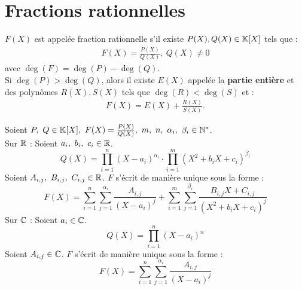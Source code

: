 \section{Fractions rationnelles}
\begin{definition}
	$F(X)$ est appelée fraction rationnelle s'il existe $P(X), Q(X) \in \mathbb{K}[X]$ tels que :
	\begin{align*}
		F(X) = \frac{P(X)}{Q(X)},\ Q(X) \neq 0
	\end{align*}
	avec $\deg(F) = \deg(P) - \deg(Q)$. \\
	Si $\deg(P) > \deg(Q)$, alors il existe $E(X)$ appelée la \textbf{partie entière} et des polynômes $R(X), S(X)$ tels que $\deg(R) < \deg(S)$ et : 
	\begin{align*}
		F(X) = E(X) + \frac{R(X)}{S(X)}.
	\end{align*}
\end{definition}

\begin{theorem}
	Soient $P,\ Q \in \mathbb{K}[X],\ F(X) = \frac{P(X)}{Q(X)},\ m,\ n,\ \alpha_i,\ \beta_i \in \mathbb{N}^*$.
	\\
	Sur $\mathbb{R}$ : Soient $a_i,\ b_i,\ c_i \in \mathbb{R}$.
	\[ Q(X) = \prod_{i = 1}^{n} (X - a_i)^{\alpha_i} \cdot \prod_{i = 1}^{m} (X^2 + b_i X + c_i)^{\beta_i} \]
	Soient $A_{i, j},\ B_{i, j},\ C_{i, j} \in \mathbb{R}$. $F$ s'écrit de manière unique sous la forme :
	\[ F(X) = \sum_{i = 1}^{n} \sum_{j = 1}^{\alpha_i} \frac{A_{i, j}}{\left(X - a_i\right)^{j}} + \sum_{i = 1}^{m} \sum_{j = 1}^{\beta_i} \frac{B_{i, j}X + C_{i, j}}{(X^2 + b_iX + c_i)^{j}} \]
	Sur $\mathbb{C}$ : Soient $a_i \in \mathbb{C}$.
	\[ Q(X) = \prod_{i = 1}^{n} (X - a_i)^{n} \]
	Soient $A_{i, j} \in \mathbb{C}$. $F$ s'écrit de manière unique sous la forme :
	\[ F(X) = \sum_{i = 1}^{n} \sum_{j = 1}^{\alpha_i} \frac{A_{i, j}}{\left(X - a_i\right)^{j}} \]
\end{theorem}

